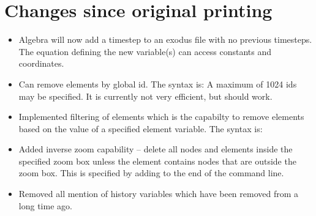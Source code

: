 \section{Changes since original printing}
\begin{itemize}
  \item Algebra will now add a timestep to an exodus file with no previous timesteps.  The equation 
	    defining the new variable(s) can access constants and coordinates.

  \item	Can remove elements by global id. The syntax is:
    A maximum of 1024 ids may be specified. It is currently not very efficient, but should work.

  \item Implemented filtering of elements which is the capabilty
    to remove elements based on the value of a specified element
    variable.  The syntax is:



\item Added inverse zoom capability -- delete all nodes and
  elements inside the specified zoom box unless the element
  contains nodes that are outside the zoom box. This is
  specified by adding  to the end of the
   command line.

\item Removed all mention of history variables which have been removed from \exo{} a long time ago.
\end{itemize}

